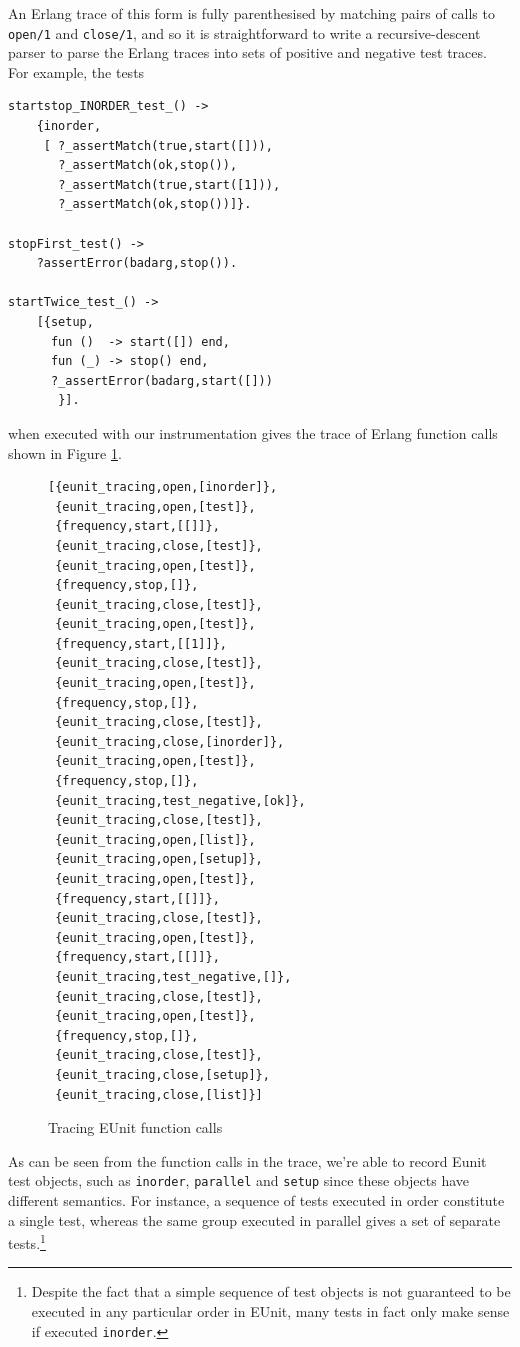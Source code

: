 \documentclass[]{sigplanconf}
\begin{document}
An Erlang trace of this form is fully parenthesised by matching pairs of calls to \texttt{open/1} and \texttt{close/1}, and so it is straightforward to write a recursive-descent parser to parse the Erlang traces into sets of positive and negative test traces. For example, the tests
\begin{verbatim}
startstop_INORDER_test_() ->
    {inorder,
     [ ?_assertMatch(true,start([])),
       ?_assertMatch(ok,stop()),
       ?_assertMatch(true,start([1])),
       ?_assertMatch(ok,stop())]}.

stopFirst_test() ->
    ?assertError(badarg,stop()).

startTwice_test_() ->
    [{setup,
      fun ()  -> start([]) end,       
      fun (_) -> stop() end,         
      ?_assertError(badarg,start([]))  
       }].
\end{verbatim}
when executed with our instrumentation gives the  trace of Erlang function calls shown in Figure \ref{tracing-eunit}.
\begin{figure}
\begin{verbatim}
[{eunit_tracing,open,[inorder]},
 {eunit_tracing,open,[test]},
 {frequency,start,[[]]},
 {eunit_tracing,close,[test]},
 {eunit_tracing,open,[test]},
 {frequency,stop,[]},
 {eunit_tracing,close,[test]},
 {eunit_tracing,open,[test]},
 {frequency,start,[[1]]},
 {eunit_tracing,close,[test]},
 {eunit_tracing,open,[test]},
 {frequency,stop,[]},
 {eunit_tracing,close,[test]},
 {eunit_tracing,close,[inorder]},
 {eunit_tracing,open,[test]},
 {frequency,stop,[]},
 {eunit_tracing,test_negative,[ok]},
 {eunit_tracing,close,[test]},
 {eunit_tracing,open,[list]},
 {eunit_tracing,open,[setup]},
 {eunit_tracing,open,[test]},
 {frequency,start,[[]]},
 {eunit_tracing,close,[test]},
 {eunit_tracing,open,[test]},
 {frequency,start,[[]]},
 {eunit_tracing,test_negative,[]},
 {eunit_tracing,close,[test]},
 {eunit_tracing,open,[test]},
 {frequency,stop,[]},
 {eunit_tracing,close,[test]},
 {eunit_tracing,close,[setup]},
 {eunit_tracing,close,[list]}]
\end{verbatim}
\caption{Tracing EUnit function calls}
\label{tracing-eunit}
\end{figure}
As can be seen from the function calls in the trace, we're able to record Eunit test objects, such as \texttt{inorder}, \texttt{parallel} and \texttt{setup} since these objects have different semantics. For instance, a sequence of tests executed in order constitute a single test, whereas the same group executed in parallel gives a set of separate tests.\footnote{Despite the fact that a simple sequence of test objects is not guaranteed to be executed in any particular order in EUnit, many tests in fact only make sense if executed \texttt{inorder}.}
\end{document}
